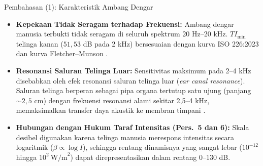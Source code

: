 \documentclass[aspectratio=169, 10pt]{beamer}
\begin{document}
	\begin{frame}{Pembahasan (1): Karakteristik Ambang Dengar}
		\begin{itemize}
			\item \textbf{Kepekaan Tidak Seragam terhadap Frekuensi:}
			Ambang dengar manusia terbukti tidak seragam di seluruh spektrum 20 Hz--20 kHz. $TI_{\min}$ telinga kanan ($51{,}53$ dB pada 2 kHz) bersesuaian dengan kurva ISO 226:2023 dan kurva Fletcher--Munson \parencite{iso2023}.

			\vspace{0.15cm}
			\item \textbf{Resonansi Saluran Telinga Luar:}
			Sensitivitas maksimum pada 2--4 kHz disebabkan oleh efek resonansi saluran telinga luar (\textit{ear canal resonance}). Saluran telinga berperan sebagai pipa organa tertutup satu ujung (panjang $\sim\!2{,}5$ cm) dengan frekuensi resonansi alami sekitar 2{,}5--4 kHz, memaksimalkan transfer daya akustik ke membran timpani \parencite{moller2024}.

			\vspace{0.15cm}
			\item \textbf{Hubungan dengan Hukum Taraf Intensitas (Pers.\ 5 dan 6):}
			Skala desibel digunakan karena telinga manusia merespons intensitas secara logaritmik ($\beta \propto \log I$), sehingga rentang dinamisnya yang sangat lebar ($10^{-12}$ hingga $10^{2}\ \text{W/m}^2$) dapat direpresentasikan dalam rentang 0--130 dB.
		\end{itemize}
	\end{frame}
\end{document}
